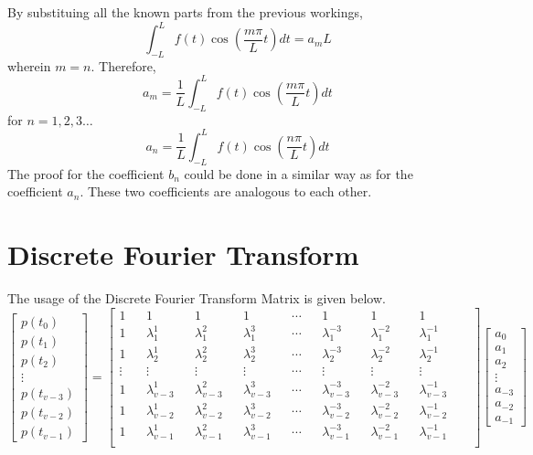 By substituing all the known parts from the previous workings, 
$$\int_{-L}^{L}f(t)\cos\left(\frac{m\pi}{L}t\right)dt = a_m L$$
wherein $m = n$. Therefore,
$$a_m = \frac{1}{L}\int_{-L}^{L}f(t)\cos\left(\frac{m\pi}{L}t\right)dt$$
for $n=1,2,3\dots$
$$a_n = \frac{1}{L}\int_{-L}^{L}f(t)\cos\left(\frac{n\pi}{L}t\right)dt$$
The proof for the coefficient $b_n$ could be done in a similar way as for the coefficient $a_n$. These two coefficients are analogous to each other.
\section{Discrete Fourier Transform}
\begin{comment}
\end{comment}
The usage of the Discrete Fourier Transform Matrix is given below.
$$\begin{bmatrix}p(t_0) \\ p(t_1) \\ p(t_2 )\\ \vdots \\ p(t_{v-3}) \\ p(t_{v-2}) \\ p(t_{v-1}) \end{bmatrix} = 
\begin{bmatrix}
 1 && 1 && 1 && 1 && \cdots && 1 && 1 && 1 \\
 1 && \lambda_{1}^{1} && \lambda_{1}^{2} && \lambda_{1}^{3} && \cdots && \lambda_{1}^{-3} && \lambda_{1}^{-2} && \lambda_{1}^{-1}  && \\
 1 && \lambda_{2}^{1} && \lambda_{2}^{2} && \lambda_{2}^{3} && \cdots && \lambda_{2}^{-3} && \lambda_{2}^{-2} && \lambda_{2}^{-1}  && \\
 \vdots && \vdots && \vdots && \vdots && \cdots && \vdots && \vdots && \vdots && \\
 1 && \lambda_{v-3}^{1} && \lambda_{v-3}^{2} && \lambda_{v-3}^{3} && \cdots && \lambda_{v-3}^{-3} && \lambda_{v-3}^{-2} && \lambda _{v-3}^{-1} && \\
 1 && \lambda_{v-2}^{1} && \lambda_{v-2}^{2} && \lambda_{v-2}^{3} && \cdots && \lambda_{v-2}^{-3} && \lambda_{v-2}^{-2} && \lambda _{v-2}^{-1} && \\
 1 && \lambda_{v-1}^{1} && \lambda_{v-1}^{2} && \lambda_{v-1}^{3} && \cdots && \lambda_{v-1}^{-3} && \lambda_{v-1}^{-2} && \lambda _{v-1}^{-1} && \\
\end{bmatrix}
\begin{bmatrix} a_{0} \\ a_{1} \\ a_{2} \\ \vdots \\ a_{-3} \\ a_{-2} \\ a_{-1} \end{bmatrix} $$
